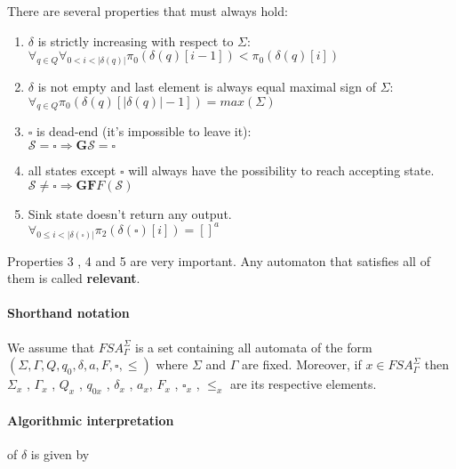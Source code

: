 \documentclass[12pt]{article}
\begin{document}
There are several properties that must always hold:
\begin{enumerate}
	\item $\delta$ is strictly increasing with respect to $\Sigma$: \\ 
	$\forall_{q\in Q} \forall_{0<i<\vert\delta(q)\vert}  \pi_0(\delta(q)[i-1]) <  \pi_0(\delta(q)[i])$
	\item $\delta$ is not empty and last element is always equal maximal sign of $\Sigma$: \\ 
	$\forall_{q\in Q}  \pi_0(\delta(q)[\vert \delta(q) \vert - 1]) = max(\Sigma)$
	\item $\square$ is dead-end (it's impossible to leave it): \\
	$\mathcal{S} = \square \Rightarrow\mathbf{ G} \mathcal{S} = \square$
	\item all states except $\square$ will always have the possibility to reach accepting state. \\
	$\mathcal{S} \ne \square \Rightarrow \mathbf{G}\mathbf{F} F(\mathcal{S})$
	\item Sink state doesn't return any output. \\
	$\forall_{0\le i<\vert \delta(\square) \vert} \pi_2( \delta(\square)[i] ) =  []^a$

\end{enumerate}
 Properties 3 , 4 and 5 are very important. Any automaton that satisfies all of them is called \textbf{relevant}. \\
 
\paragraph{Shorthand notation} We assume that $FSA^{\Sigma}_{\Gamma}$ is a set containing all automata of the form $(\Sigma ,\Gamma ,  Q , q_0 , \delta , a , F , \square , \le )$ where $\Sigma$ and $\Gamma$ are fixed. Moreover, if $x \in FSA^{\Sigma}_{\Gamma}$ then  $\Sigma_x $ , $\Gamma_x $ , $Q_x $  , $q_{0x} $  , $\delta_x $ , $a_x$, $F_x $  , $\square_x  $ , $\le_x $  are its respective elements. \\
 

\paragraph{ Algorithmic interpretation} of $\delta$ is given by  
\end{document}
